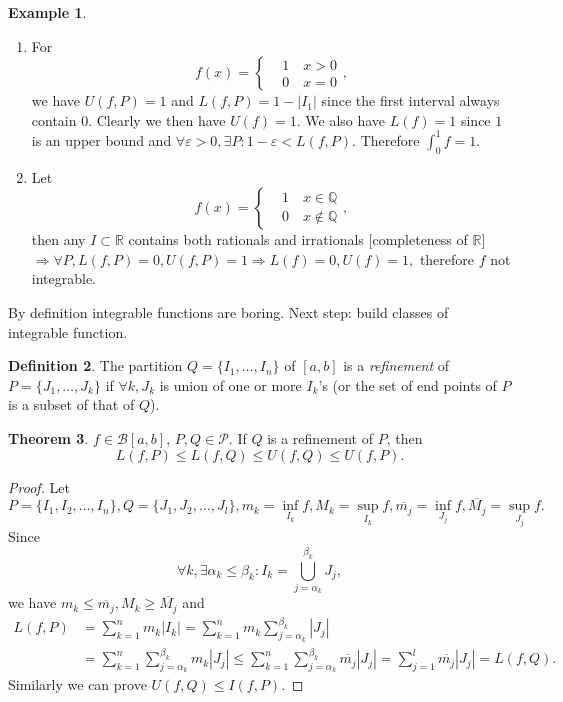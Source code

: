 \documentclass[a4paper]{article}
\theoremstyle{definition}
\newtheorem{defn}{Definition}[subsection]
\newtheorem{thm}[defn]{Theorem}
\newtheorem{example}[defn]{Example}
\begin{document}
\begin{example}
\begin{enumerate}
	\item For
\[
f(x)=\left\{\begin{aligned}
		&1 \quad x>0 \\ &0 \quad x=0
	\end{aligned} \right. ,
\]
 we have $U(f,P)=1$ and $L(f,P)=1-|I_1|$ since the first interval always contain 0. Clearly we then have $U(f)=1$. We also have $L(f)=1$ since $1$ is an upper bound and $\forall \varepsilon >0, \exists P : 1-\varepsilon <L(f,P) .$ Therefore $\int_0^1 f = 1$.
\item Let
\[
f(x)=\left\{\begin{aligned}
	&1 \quad x\in \mathbb Q \\ &0 \quad x\not\in \mathbb Q
\end{aligned} \right. ,
\]
then any $I \subset \mathbb R$ contains both rationals and irrationals [completeness of $\mathbb R$] $\Rightarrow \forall P, L(f,P)=0, U(f,P)=1 \Rightarrow L(f)=0, U(f)=1, $ therefore $f$ not integrable.
\end{enumerate} 
\end{example}

By definition integrable functions are boring. Next step: build classes of integrable function.

\begin{defn}
	The partition $Q=\{I_1,\ldots,I_n\}$ of $[a,b]$ is a \textit{refinement} of $P=\{J_1,\ldots,J_k\}$ if $\forall k, J_k$ is union of one or more $I_k$'s (or the set of end points of $P$ is a subset of that of $Q$).
\end{defn}

\begin{thm}
	$f\in \mathcal B [a,b]$, $P,Q\in \mathcal P$. If $Q$ is a refinement of $P$, then
\[
L(f,P)\leq L(f,Q) \leq U(f,Q)\leq U(f,P) .
\]
\end{thm}

\begin{proof}
	Let $P=\{I_1,I_2,\ldots,I_n\}, Q=\{J_1,J_2,\ldots,J_l\}, m_k=\underset{I_k}{\inf} f, M_k=\underset{I_k}{\sup} f, \overline{m_j}=\underset{J_j}{\inf} f, \overline{M_j}=\underset{J_j}{\sup} f .$ Since
\[
\forall k, \exists \alpha_k \leq \beta_k : I_k = \bigcup_{j=\alpha_k}^{\beta_k} J_j ,
\]
we have $m_k \leq \overline{m_j}, M_k \geq \overline{M_j}$ and
\[
\begin{aligned}
		L(f,P) &=\sum_{k=1}^n m_k |I_k|=\sum_{k=1}^n m_k \sum_{j=\alpha_k}^{\beta_k} |J_j| \\ &=\sum_{k=1}^n \sum_{j=\alpha_k}^{\beta_k} m_k |J_j| \leq \sum_{k=1}^n \sum_{j=\alpha_k}^{\beta_k} \overline{m_j} |J_j| =\sum_{j=1}^l \overline{m_j} |J_j| = L(f,Q) .
	\end{aligned}
\]
Similarly we can prove $U(f,Q)\leq I(f,P) .$
\end{proof}
\end{document}
